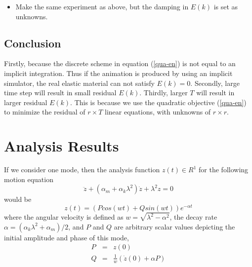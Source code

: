 \documentclass[twocolumn,a4paper]{article}
\begin{document}
\begin{itemize}
\item Make the same experiment as above, but the damping in $E(k)$ is set as
  unknowns.
\end{itemize}

\subsection{Conclusion}
Firstly, because the discrete scheme in equation (\ref{qua-en}) is not equal to
an implicit integration. Thus if the animation is produced by using an implicit
simulator, the real elastic material can not satisfy $E(k)=0$. Secondly, large
time step will result in small residual $E(k)$. Thirdly, larger $T$ will result
in larger residual $E(k)$. This is because we use the quadratic objective
(\ref{qua-en}) to minimize the residual of $r\times T$ linear equations, with
unknowns of $r\times r$.

\section{Analysis Results}
If we consider one mode, then the analysis function $z(t)\in R^1$ for the
following motion equation
\begin{equation} \label{deeq}
  \ddot{z} + (\alpha_m+\alpha_k\lambda^2)\dot{z} + \lambda^2z = 0
\end{equation}
would be
\begin{equation} \label{oss}
  z(t) = (Pcos(wt) + Qsin(wt))e^{-\alpha t}
\end{equation}
where the angular velocity is defined as $w = \sqrt{\lambda^2-\alpha^2}$, the
decay rate $\alpha = (\alpha_k\lambda^2+\alpha_m)/2$, and $P$ and $Q$ are
arbitrary scalar values depicting the initial amplitude and phase of this mode,
\begin{eqnarray}\label{PQ}
  P &=& z(0) \\
  Q &=& \frac{1}{w}(\dot{z}(0) + \alpha P)
\end{eqnarray}

\end{document}
